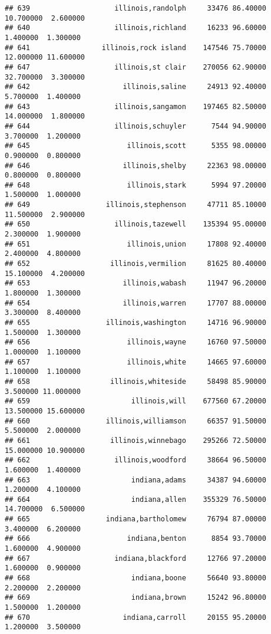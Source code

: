 \documentclass[
]{article}
\begin{document}
\begin{verbatim}
## 639                    illinois,randolph     33476 86.40000 10.700000  2.600000
## 640                    illinois,richland     16233 96.60000  1.400000  1.300000
## 641                 illinois,rock island    147546 75.70000 12.000000 11.600000
## 647                    illinois,st clair    270056 62.90000 32.700000  3.300000
## 642                      illinois,saline     24913 92.40000  5.700000  1.400000
## 643                    illinois,sangamon    197465 82.50000 14.000000  1.800000
## 644                    illinois,schuyler      7544 94.90000  3.700000  1.200000
## 645                       illinois,scott      5355 98.00000  0.900000  0.800000
## 646                      illinois,shelby     22363 98.00000  0.800000  0.800000
## 648                       illinois,stark      5994 97.20000  1.500000  1.000000
## 649                  illinois,stephenson     47711 85.10000 11.500000  2.900000
## 650                    illinois,tazewell    135394 95.00000  2.300000  1.900000
## 651                       illinois,union     17808 92.40000  2.400000  4.800000
## 652                   illinois,vermilion     81625 80.40000 15.100000  4.200000
## 653                      illinois,wabash     11947 96.20000  1.800000  1.300000
## 654                      illinois,warren     17707 88.00000  3.300000  8.400000
## 655                  illinois,washington     14716 96.90000  1.500000  1.300000
## 656                       illinois,wayne     16760 97.50000  1.000000  1.100000
## 657                       illinois,white     14665 97.60000  1.100000  1.100000
## 658                   illinois,whiteside     58498 85.90000  3.500000 11.000000
## 659                        illinois,will    677560 67.20000 13.500000 15.600000
## 660                  illinois,williamson     66357 91.50000  5.500000  2.000000
## 661                   illinois,winnebago    295266 72.50000 15.000000 10.900000
## 662                    illinois,woodford     38664 96.50000  1.600000  1.400000
## 663                        indiana,adams     34387 94.60000  1.200000  4.100000
## 664                        indiana,allen    355329 76.50000 14.700000  6.500000
## 665                  indiana,bartholomew     76794 87.00000  3.400000  6.200000
## 666                       indiana,benton      8854 93.70000  1.600000  4.900000
## 667                    indiana,blackford     12766 97.20000  1.600000  0.900000
## 668                        indiana,boone     56640 93.80000  2.200000  2.200000
## 669                        indiana,brown     15242 96.80000  1.500000  1.200000
## 670                      indiana,carroll     20155 95.20000  1.200000  3.500000

\end{verbatim}
\end{document}
